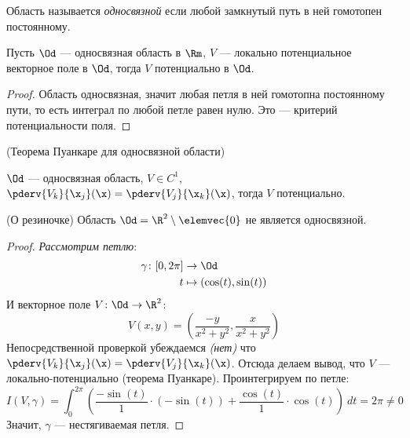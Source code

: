 \begin{definition}
    Область называется \textit{односвязной} если любой замкнутый путь в ней
    гомотопен постоянному.
\end{definition}

\begin{theorem}

    Пусть $\Od$ --- односвязная область в $\Rm$, $V$ --- локально потенциальное
    векторное поле в $\Od$, тогда $V$ потенциально в $\Od$.
\end{theorem}
\begin{proof}
    Область односвязная, значит любая петля в ней гомотопна постоянному пути, то есть
    интеграл по любой петле равен нулю. Это --- критерий потенциальности поля.
\end{proof}

\begin{corollary}(Теорема Пуанкаре для односвязной области)

    $\Od$ --- односвязная область, $V \in C^1$, $\pderv{V_k}{\x_j}(\x) = \pderv{V_j}{\x_k}(\x)$,
    тогда $V$ потенциально.
\end{corollary}

\begin{theorem}(О резиночке)
    Область $\Od = \R^2 \setminus \elemvec{0}$ не является односвязной.
\end{theorem}
\begin{proof}
    \textit{Рассмотрим петлю}:
\begin{align*}
    \gamma \colon [0, 2\pi] &\to \Od \\
    t &\mapsto (\cos(t), \sin(t))
\end{align*}
    И векторное поле $V \colon \Od \to \R^2$:
\[
    V(x, y) = \left( \frac{-y}{x^2 + y^2}, \frac{x}{x^2 + y^2} \right)
\]
    Непосредственной проверкой убеждаемся \textit{(нет)} что $\pderv{V_k}{\x_j}(\x) =
    \pderv{V_j}{\x_k}(\x)$. Отсюда делаем вывод, что $V$ --- локально-потенциально
    (теорема Пуанкаре). Проинтегрируем по петле:
\[
    I(V, \gamma) = \int_0^{2\pi}{\left(\frac{-\sin(t)}{1} \cdot (-\sin(t)) +
    \frac{\cos(t)}{1} \cdot \cos(t) \right) ~dt} = 2\pi \neq 0
\]
    Значит, $\gamma$ --- нестягиваемая петля.
\end{proof}
